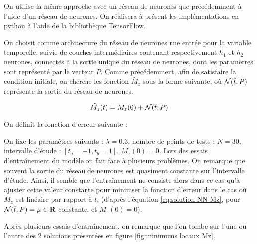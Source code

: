 \documentclass[12pt]{report}
\begin{document}
On utilise la même approche avec un réseau de neurones que précédemment à l'aide d'un réseau de neurones.
On réalisera à présent les implémentations en python à l'aide de la bibliothèque TensorFlow.


On choisit comme architecture du réseau de neurones une entrée pour la variable temporelle, 
suivie de couches intermédiaires contenant respectivement $h_1$ et $h_2$ neurones, connectés
à la sortie unique du réseau de neurones, dont les paramètres sont représenté par le vecteur $P$.
Comme précédemment, afin de satisfaire la condition initiale, on cherche les fonction $\tilde{M_z}$
sous la forme suivante, où ${\mathcal{N}}(\Tilde{t},P)$ représente la sortie du réseau de neurones.

\begin{equation}
    \Tilde{M_z}(\Tilde{t}) = M_z(0) + {\mathcal{N}}(\Tilde{t},P) 
    \label{eq:solution NN Mz}
\end{equation}

On définit la fonction d'erreur suivante :


On fixe les paramètres suivants : $\lambda = 0.3$, nombre de points de tests : $N=30$, 
intervalle d'étude : $[t_a = -1, t_b = 1]$, $M_z(0) = 0$.
Lors des essais d'entraînement du modèle on fait face à plusieurs problèmes.
On remarque que souvent la sortie du réseau de neurones est quasiment constante
sur l'intervalle d'étude. Ainsi, il semble que l'entraînement ne consiste alors dans ce 
cas qu'à ajuster cette valeur constante pour minimser la fonction d'erreur dans le cas 
où $M_z$ est linéaire par rapport à $\tilde{t}$, (d'après l'équation \ref{eq:solution NN Mz},
pour ${\mathcal{N}}(\Tilde{t},P) = \mu\in \mathbf{R}$ constante, et $M_z(0) = 0$).

Après plusieurs essais d'entraînement, on remarque que l'on tombe sur l'une ou l'autre des 2 solutions
présentées en figure \ref{fig:minimums locaux Mz}.
\end{document}
